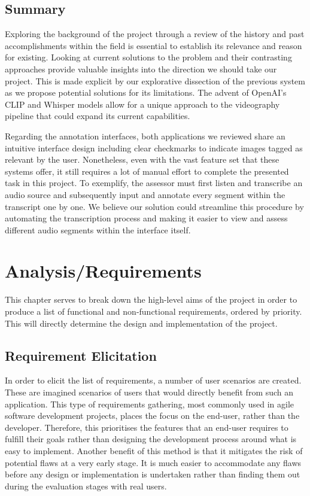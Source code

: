 \documentclass{l4proj}
\begin{document}
\section{Summary}
Exploring the background of the project through a review of the history and past accomplishments within the field is essential to establish its relevance and reason for existing. Looking at current solutions to the problem and their contrasting approaches provide valuable insights into the direction we should take our project. This is made explicit by our explorative dissection of the previous system as we propose potential solutions for its limitations. The advent of OpenAI's CLIP and Whisper \citep{whisper} models allow for a unique approach to the videography pipeline that could expand its current capabilities.

Regarding the annotation interfaces, both applications we reviewed share an intuitive interface design including clear checkmarks to indicate images tagged as relevant by the user. Nonetheless, even with the vast feature set that these systems offer, it still requires a lot of manual effort to complete the presented task in this project. To exemplify, the assessor must first listen and transcribe an audio source and subsequently input and annotate every segment within the transcript one by one. We believe our solution could streamline this procedure by automating the transcription process and making it easier to view and assess different audio segments within the interface itself.


\chapter{Analysis/Requirements}
\label{chap:requirements}
This chapter serves to break down the high-level aims of the project in order to produce a list of functional and non-functional requirements, ordered by priority. This will directly determine the design and implementation of the project.

\section{Requirement Elicitation}
In order to elicit the list of requirements, a number of user scenarios are created. These are imagined scenarios of users that would directly benefit from such an application. This type of requirements gathering, most commonly used in agile software development projects, places the focus on the end-user, rather than the developer. Therefore, this prioritises the features that an end-user requires to fulfill their goals rather than designing the development process around what is easy to implement. Another benefit of this method is that it mitigates the risk of potential flaws at a very early stage. It is much easier to accommodate any flaws before any design or implementation is undertaken rather than finding them out during the evaluation stages with real users. 
\end{document}
